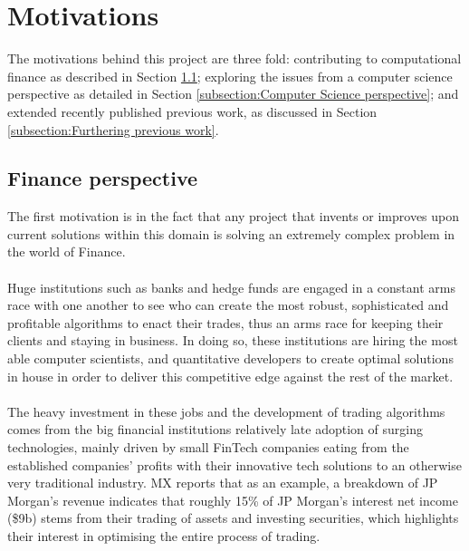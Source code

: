 \documentclass[ %
                    author={Ashwinder Khurana},
                supervisor={Prof Dave Cliff},
                    degree={MEng},
                     title={The Deeply Reinforced Trader},
                  subtitle={},
                      type={enterprise},
                      year={2020} ]{dissertation}
\begin{document}
\section{Motivations}
 
The motivations behind this project are three fold: contributing to computational finance as described in Section \ref{subsection:Finance perspective}; exploring the issues from a computer science perspective as detailed in Section \ref{subsection:Computer Science perspective}; and extended recently published previous work, as discussed in Section \ref{subsection:Furthering previous work}. 

\vspace{0.5cm}
\subsection{Finance perspective}
\label{subsection:Finance perspective}
\vspace{0.5cm} 
The first motivation is in the fact that any project that invents or improves upon current solutions within this domain is solving an extremely complex problem in the world of Finance. 
\\
\\
Huge institutions such as banks and hedge funds are engaged in a constant arms race with one another to see who can create the most robust, sophisticated and profitable algorithms to enact their trades, thus an arms race for keeping their clients and staying in business. In doing so, these institutions are hiring the most able computer scientists, and quantitative developers to create optimal solutions in house in order to deliver this competitive edge against the rest of the market. 
\\
\\
The heavy investment in these jobs and the development of trading algorithms comes from the big financial institutions relatively late adoption of surging technologies, mainly driven by small FinTech companies eating from the established companies' profits with their innovative tech solutions to an otherwise very traditional industry.  MX reports \cite{mx banks profit breakdown https://www.mx.com/moneysummit/top-us-retail-banks-income-revenue} that as an example, a breakdown of JP Morgan's revenue indicates that roughly 15\% of JP Morgan's interest net income (\$9b) stems from their trading of assets and investing securities, which highlights their interest in optimising the entire process of trading. 
\\
\end{document}
